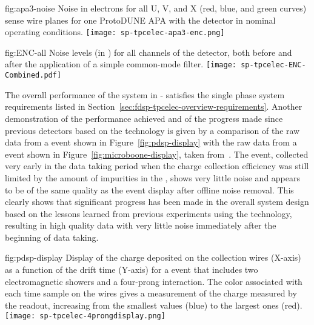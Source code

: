 \begin{dunefigure}
{fig:apa3-noise}
{Noise in electrons for all U, V, and X (red, blue, and green curves) sense 
wire planes for one ProtoDUNE APA with the detector in nominal operating 
conditions.}
\texttt{[image: sp-tpcelec-apa3-enc.png]}
\end{dunefigure}

\begin{dunefigure}
{fig:ENC-all}
{Noise levels (in ) for all channels of the  detector, both
before and after the application of a simple common-mode filter.}
\texttt{[image: sp-tpcelec-ENC-Combined.pdf]}
\end{dunefigure}

The overall performance of the  system in 
- satisfies the  
single phase   system requirements 
listed in Section~\ref{sec:fdsp-tpcelec-overview-requirements}. 
Another demonstration of the performance achieved
and of the progress made since previous detectors based on the
 technology is given by a comparison of the raw data from 
a  event shown in Figure~\ref{fig:pdsp-display} with
the raw data from a  event shown in
Figure~\ref{fig:microboone-display}, taken from~\cite{Acciarri:2017sde}.
The  event, collected very early in the data taking
period when the charge collection efficiency was still limited
by the amount of impurities in the , shows very little
noise and appears to be of the same quality as the 
event display after offline noise removal. This clearly shows
that significant progress has been made in the overall system
design based on the lessons learned from previous experiments
using the  technology, resulting in high quality
data with very little noise immediately after the beginning of
data taking.


\begin{dunefigure}
{fig:pdsp-display}
{Display of the charge deposited on the collection wires (X-axis) as
a function of the drift time (Y-axis) for a  event 
that includes two electromagnetic showers and a four-prong interaction.
The color associated with each time sample on the 
wires gives a measurement of the charge measured by the 
readout, increasing from the smallest values (blue) to the largest
ones (red).}
\texttt{[image: sp-tpcelec-4prongdisplay.png]}
\end{dunefigure}

